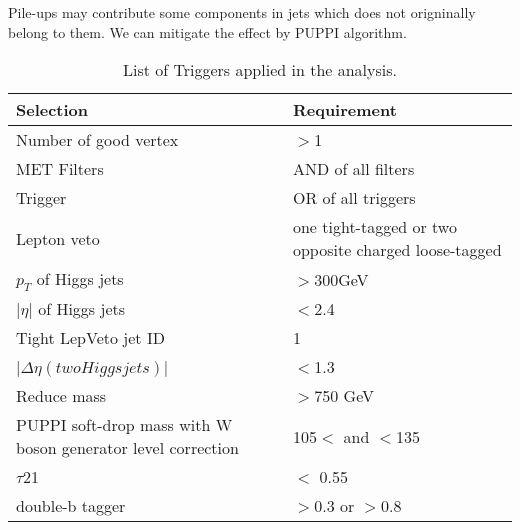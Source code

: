 Pile-ups may contribute some components in jets which does not origninally belong to them. We can mitigate the effect by PUPPI algorithm.
 
 
 



\begin{table}[h!]
  \begin{center}
    \begin{tabular}{ll}
    Selection & Requirement \\
    \hline
    Number of good vertex & $>$1 \\
    MET Filters & AND of all filters\\
	Trigger & OR of all triggers\\
	Lepton veto & one tight-tagged or two opposite charged loose-tagged \\
    $p_{T}$ of Higgs jets & $>$300GeV \\
	|$\eta$| of Higgs jets & $<$2.4 \\
	Tight LepVeto jet ID & 1 \\
	|$\Delta \eta (two Higgs jets)$| & $<$1.3 \\
	Reduce mass & $>$750 GeV \\
	PUPPI soft-drop mass with W boson generator level correction & 105$<$ and $<$135 \\
	$\tau$21 & $<$ 0.55 \\
	double-b tagger & $>$0.3 or $>$0.8 \\
	\hline
    \end{tabular}
  \end{center}

  \caption{List of Triggers applied in the analysis.}
\end{table} 
	